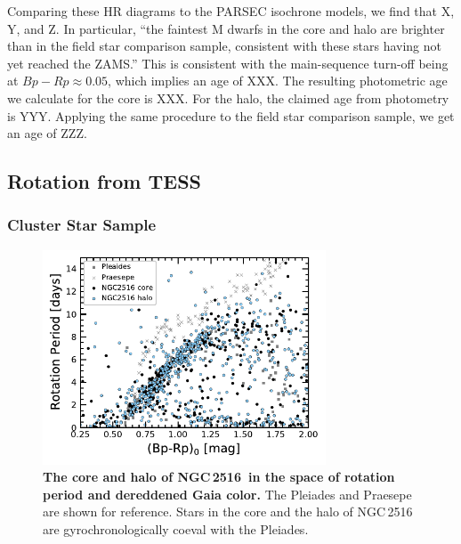 \documentclass[12pt,twocolumn,tighten]{aastex63}
\newcommand{\cn}{NGC\,2516} %
\begin{document}
Comparing these HR diagrams to the PARSEC isochrone models, we find
that X, Y, and Z.
In particular, ``the faintest M dwarfs in the core and halo are
brighter than in the field star comparison sample, consistent with
these stars having not yet reached the ZAMS.''
This is consistent with the 
main-sequence turn-off being at $Bp-Rp\approx0.05$, which implies an
age of XXX.
The resulting photometric age we calculate for the core is XXX.
For the halo, the claimed age from photometry is YYY.
Applying the same procedure to the field star comparison sample,
we get an age of ZZZ.


\subsection{Rotation from TESS}
\label{subsec:tess}

\subsubsection{Cluster Star Sample}

\begin{figure}[t]
	\begin{center}
		\leavevmode
    \includegraphics[width=0.75\textwidth]{f3a.pdf}
	
	\end{center}
	\vspace{-0.7cm}
	\caption{ {\bf The core and halo of \cn\ in the space of rotation
    period and dereddened Gaia color.}
    The Pleiades \citep[125\,Myr][]{rebull_rotation_2016a}
    and Praesepe \citep[650\,Myr][]{douglas_poking_2017}
    are shown for reference.
    Stars in the core and the halo of NGC\,2516 are
    gyrochronologically coeval with the Pleiades.
		\label{fig:rot}
	}
\end{figure}
\end{document}
